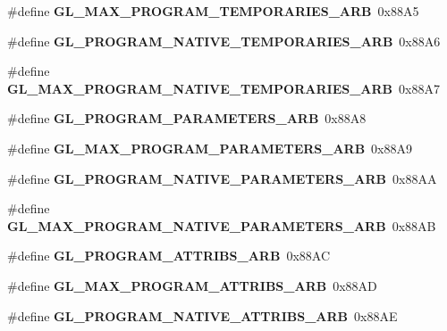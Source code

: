 \begin{DoxyCompactItemize}
\item 
\#define {\bfseries G\+L\+\_\+\+M\+A\+X\+\_\+\+P\+R\+O\+G\+R\+A\+M\+\_\+\+T\+E\+M\+P\+O\+R\+A\+R\+I\+E\+S\+\_\+\+A\+R\+B}~0x88\+A5\label{_s_d_l__opengl_8h_a2b82d98a4930003284478c725924fa73}

\item 
\#define {\bfseries G\+L\+\_\+\+P\+R\+O\+G\+R\+A\+M\+\_\+\+N\+A\+T\+I\+V\+E\+\_\+\+T\+E\+M\+P\+O\+R\+A\+R\+I\+E\+S\+\_\+\+A\+R\+B}~0x88\+A6\label{_s_d_l__opengl_8h_ac3078c1fbbfc034e4ac4a3a5d92277b6}

\item 
\#define {\bfseries G\+L\+\_\+\+M\+A\+X\+\_\+\+P\+R\+O\+G\+R\+A\+M\+\_\+\+N\+A\+T\+I\+V\+E\+\_\+\+T\+E\+M\+P\+O\+R\+A\+R\+I\+E\+S\+\_\+\+A\+R\+B}~0x88\+A7\label{_s_d_l__opengl_8h_a47a6f625a2473ab8725cdce296e1352d}

\item 
\#define {\bfseries G\+L\+\_\+\+P\+R\+O\+G\+R\+A\+M\+\_\+\+P\+A\+R\+A\+M\+E\+T\+E\+R\+S\+\_\+\+A\+R\+B}~0x88\+A8\label{_s_d_l__opengl_8h_ad6c7d73a586bb05a738cf39759217e81}

\item 
\#define {\bfseries G\+L\+\_\+\+M\+A\+X\+\_\+\+P\+R\+O\+G\+R\+A\+M\+\_\+\+P\+A\+R\+A\+M\+E\+T\+E\+R\+S\+\_\+\+A\+R\+B}~0x88\+A9\label{_s_d_l__opengl_8h_ae9fe65e3170515ee05754f337ddfe646}

\item 
\#define {\bfseries G\+L\+\_\+\+P\+R\+O\+G\+R\+A\+M\+\_\+\+N\+A\+T\+I\+V\+E\+\_\+\+P\+A\+R\+A\+M\+E\+T\+E\+R\+S\+\_\+\+A\+R\+B}~0x88\+A\+A\label{_s_d_l__opengl_8h_a230fe8d69cf4a541a80bae440a42a427}

\item 
\#define {\bfseries G\+L\+\_\+\+M\+A\+X\+\_\+\+P\+R\+O\+G\+R\+A\+M\+\_\+\+N\+A\+T\+I\+V\+E\+\_\+\+P\+A\+R\+A\+M\+E\+T\+E\+R\+S\+\_\+\+A\+R\+B}~0x88\+A\+B\label{_s_d_l__opengl_8h_adfec1172793bfa533edb803f498aeba4}

\item 
\#define {\bfseries G\+L\+\_\+\+P\+R\+O\+G\+R\+A\+M\+\_\+\+A\+T\+T\+R\+I\+B\+S\+\_\+\+A\+R\+B}~0x88\+A\+C\label{_s_d_l__opengl_8h_afa18236581a25d5c5c1de0da5c3d6f96}

\item 
\#define {\bfseries G\+L\+\_\+\+M\+A\+X\+\_\+\+P\+R\+O\+G\+R\+A\+M\+\_\+\+A\+T\+T\+R\+I\+B\+S\+\_\+\+A\+R\+B}~0x88\+A\+D\label{_s_d_l__opengl_8h_ac125882d6bff243eb94eab54371683e6}

\item 
\#define {\bfseries G\+L\+\_\+\+P\+R\+O\+G\+R\+A\+M\+\_\+\+N\+A\+T\+I\+V\+E\+\_\+\+A\+T\+T\+R\+I\+B\+S\+\_\+\+A\+R\+B}~0x88\+A\+E\label{_s_d_l__opengl_8h_a84ff4c23d774c5c653ac025d4c676c08}


\end{DoxyCompactItemize}

